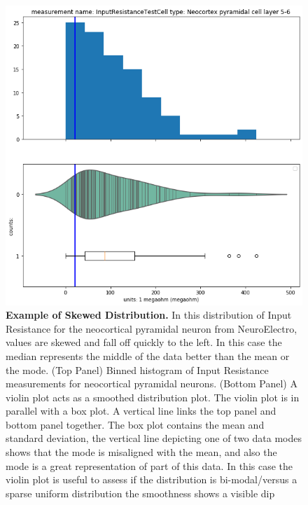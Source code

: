 \begin{figure} 
    \begin{center} 
    \includegraphics[scale=0.8]{figures/skewed_distribution.png}
    \end{center}
    \caption[Example of Skewed  Distribution]{\textbf{Example of Skewed Distribution.} In this distribution of Input Resistance for the neocortical pyramidal neuron from NeuroElectro, values are skewed and fall off quickly to the left. In this case the median represents the middle of the data better than the mean or the mode. (Top Panel) Binned histogram of Input Resistance measurements for neocortical pyramidal neurons. (Bottom Panel) A violin plot acts as a smoothed distribution plot. The violin plot is in parallel with a box plot. A vertical line links the top panel and bottom panel together. The box plot contains the mean and standard deviation, the vertical line depicting one of two data modes shows that the mode is misaligned with the mean, and also the mode is a great representation of part of this data. In this case the violin plot is useful to assess if the distribution is bi-modal/versus a sparse uniform distribution the smoothness shows a visible dip}
    \label{fig:skewed-feature}
\end{figure}   

    
